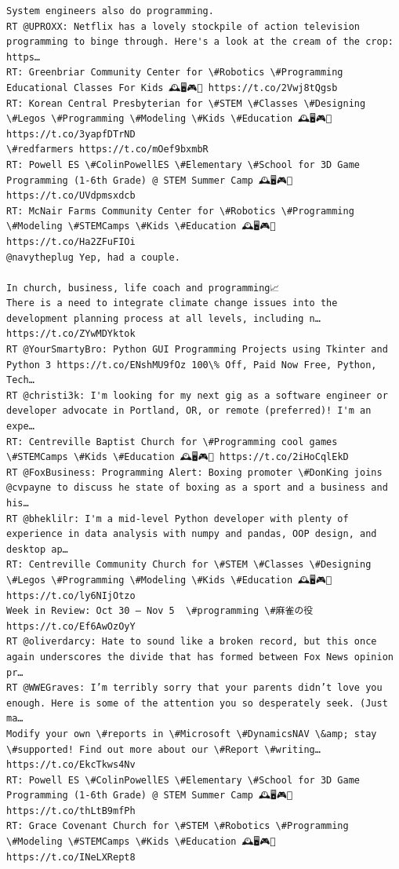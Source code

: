 \documentclass[11pt]{article}
\begin{document}
\begin{Verbatim}[commandchars=\\\{\}]
System engineers also do programming.
RT @UPROXX: Netflix has a lovely stockpile of action television programming to binge through. Here's a look at the cream of the crop: https…
RT: Greenbriar Community Center for \#Robotics \#Programming Educational Classes For Kids 🕰️🖥️🎮💎 https://t.co/2Vwj8tQgsb
RT: Korean Central Presbyterian for \#STEM \#Classes \#Designing \#Legos \#Programming \#Modeling \#Kids \#Education 🕰️🖥️🎮💎 https://t.co/3yapfDTrND
\#redfarmers https://t.co/mOef9bxmbR
RT: Powell ES \#ColinPowellES \#Elementary \#School for 3D Game Programming (1-6th Grade) @ STEM Summer Camp 🕰️🖥️🎮💎 https://t.co/UVdpmsxdcb
RT: McNair Farms Community Center for \#Robotics \#Programming \#Modeling \#STEMCamps \#Kids \#Education 🕰️🖥️🎮💎 https://t.co/Ha2ZFuFIOi
@navytheplug Yep, had a couple. 

In church, business, life coach and programming📈
There is a need to integrate climate change issues into the development planning process at all levels, including n… https://t.co/ZYwMDYktok
RT @YourSmartyBro: Python GUI Programming Projects using Tkinter and Python 3 https://t.co/ENshMU9fOz 100\% Off, Paid Now Free, Python, Tech…
RT @christi3k: I'm looking for my next gig as a software engineer or developer advocate in Portland, OR, or remote (preferred)! I'm an expe…
RT: Centreville Baptist Church for \#Programming cool games \#STEMCamps \#Kids \#Education 🕰️🖥️🎮💎 https://t.co/2iHoCqlEkD
RT @FoxBusiness: Programming Alert: Boxing promoter \#DonKing joins @cvpayne to discuss he state of boxing as a sport and a business and his…
RT @bheklilr: I'm a mid-level Python developer with plenty of experience in data analysis with numpy and pandas, OOP design, and desktop ap…
RT: Centreville Community Church for \#STEM \#Classes \#Designing \#Legos \#Programming \#Modeling \#Kids \#Education 🕰️🖥️🎮💎 https://t.co/ly6NIjOtzo
Week in Review: Oct 30 – Nov 5  \#programming \#麻雀の役 https://t.co/Ef6AwOzOyY
RT @oliverdarcy: Hate to sound like a broken record, but this once again underscores the divide that has formed between Fox News opinion pr…
RT @WWEGraves: I’m terribly sorry that your parents didn’t love you enough. Here is some of the attention you so desperately seek. (Just ma…
Modify your own \#reports in \#Microsoft \#DynamicsNAV \&amp; stay \#supported! Find out more about our \#Report \#writing… https://t.co/EkcTkws4Nv
RT: Powell ES \#ColinPowellES \#Elementary \#School for 3D Game Programming (1-6th Grade) @ STEM Summer Camp 🕰️🖥️🎮💎 https://t.co/thLtB9mfPh
RT: Grace Covenant Church for \#STEM \#Robotics \#Programming \#Modeling \#STEMCamps \#Kids \#Education 🕰️🖥️🎮💎 https://t.co/INeLXRept8

\end{Verbatim}
\end{document}
